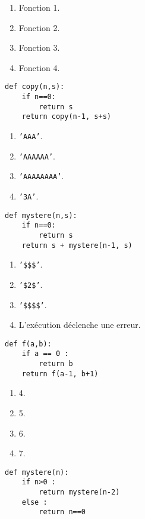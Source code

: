 \begin{enumerate}
\item Fonction 1.
\item Fonction 2.
\item Fonction 3.
\item Fonction 4.
\end{enumerate}

\begin{lstlisting}
def copy(n,s):
    if n==0:
        return s
    return copy(n-1, s+s)
\end{lstlisting}

\begin{enumerate}
\item \texttt{'AAA'}.
\item \texttt{'AAAAAA'}.
\item \texttt{'AAAAAAAA'}.
\item \texttt{'3A'}.
\end{enumerate}

\begin{lstlisting}
def mystere(n,s):
    if n==0:
        return s
    return s + mystere(n-1, s)
\end{lstlisting}

\begin{enumerate}
\item \texttt{'\$\$\$'}.
\item \texttt{'\$2\$'}.
\item \texttt{'\$\$\$\$'}. %
\item L'exécution déclenche une erreur.
\end{enumerate}

\begin{lstlisting}
def f(a,b):
    if a == 0 :
        return b
    return f(a-1, b+1)
\end{lstlisting}

\begin{enumerate}
\item 4.
\item 5.
\item 6.
\item 7. %
\end{enumerate}

\begin{lstlisting}
def mystere(n):
    if n>0 :
        return mystere(n-2)
    else :
        return n==0
\end{lstlisting}

